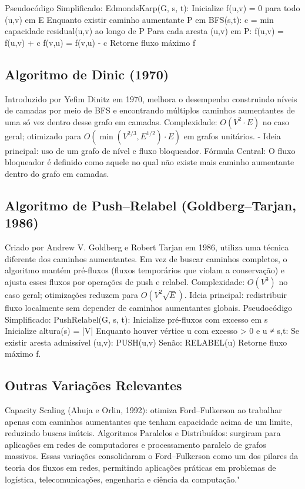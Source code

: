 \documentclass[12pt]{article}
\begin{document}
Pseudocódigo Simplificado: EdmondsKarp(G, s, t):  Inicialize f(u,v) = 0 para todo (u,v) em E Enquanto existir caminho aumentante P em BFS(s,t): c = min{ capacidade residual(u,v) ao longo de P } Para cada aresta (u,v) em P: f(u,v) = f(u,v) + c  f(v,u) = f(v,u) - c Retorne fluxo máximo f

\subsection{Algoritmo de Dinic (1970)}

Introduzido por Yefim Dinitz em 1970, melhora o desempenho construindo níveis de camadas por meio de BFS e encontrando múltiplos caminhos aumentantes de uma só vez dentro desse grafo em camadas. Complexidade: $O(V^2 \cdot E)$ no caso geral; otimizado para $O(\min(V^{2/3}, E^{1/2}) \cdot E)$ em grafos unitários. - Ideia principal: uso de um grafo de nível e fluxo bloqueador. Fórmula Central: O fluxo bloqueador é definido como aquele no qual não existe mais caminho aumentante dentro do grafo em camadas.

\subsection{Algoritmo de Push–Relabel (Goldberg–Tarjan, 1986)}

Criado por Andrew V. Goldberg e Robert Tarjan em 1986, utiliza uma técnica diferente dos caminhos aumentantes. Em vez de buscar caminhos completos, o algoritmo mantém pré-fluxos (fluxos temporários que violam a conservação) e ajusta esses fluxos por operações de push e relabel. Complexidade: $O(V^3)$ no caso geral; otimizações reduzem para $O(V^2\sqrt{E})$. Ideia principal: redistribuir fluxo localmente sem depender de caminhos aumentantes globais. Pseudocódigo Simplificado: PushRelabel(G, s, t): Inicialize pré-fluxos com excesso em s  Inicialize altura(s) = |V| Enquanto houver vértice u com excesso > 0 e u ≠ {s,t}: Se existir aresta admissível (u,v): PUSH(u,v) Senão: RELABEL(u) Retorne fluxo máximo f.

\subsection{Outras Variações Relevantes}

Capacity Scaling (Ahuja e Orlin, 1992): otimiza Ford–Fulkerson ao trabalhar apenas com caminhos aumentantes que tenham capacidade acima de um limite, reduzindo buscas inúteis. Algoritmos Paralelos e Distribuídos: surgiram para aplicações em redes de computadores e processamento paralelo de grafos massivos. Essas variações consolidaram o Ford–Fulkerson como um dos pilares da teoria dos fluxos em redes, permitindo aplicações práticas em problemas de logística, telecomunicações, engenharia e ciência da computação."
\end{document}
